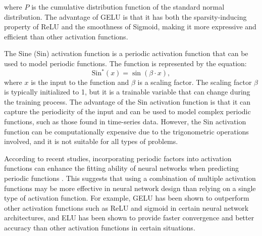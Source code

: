 
where $P$ is the cumulative distribution function of the standard normal distribution. The advantage of GELU is that it has both the sparsity-inducing property of ReLU and the smoothness of Sigmoid, making it more expressive and efficient than other activation functions.



The Sine (Sin) activation function is a periodic activation function that can be used to model periodic functions. The function is represented by the equation:
\begin{equation}
\label{eq:sin}
\operatorname{Sin^\ast} \left(x\right) = \operatorname{sin}\left(\beta \cdot x\right),
\end{equation}
where $x$ is the input to the function and $\beta$ is a scaling factor. The scaling factor $\beta$ is typically initialized to 1, but it is a trainable variable that can change during the training process.
The advantage of the Sin activation function is that it can capture the periodicity of the input and can be used to model complex periodic functions, such as those found in time-series data. However, the Sin activation function can be computationally expensive due to the trigonometric operations involved, and it is not suitable for all types of problems.

According to recent studies, incorporating periodic factors into activation functions can enhance the fitting ability of neural networks when predicting periodic functions \cite{sitzmann2020implicit}. This suggests that using a combination of multiple activation functions may be more effective in neural network design than relying on a single type of activation function. For example, GELU has been shown to outperform other activation functions such as ReLU and sigmoid in certain neural network architectures, and ELU has been shown to provide faster convergence and better accuracy than other activation functions in certain situations.

